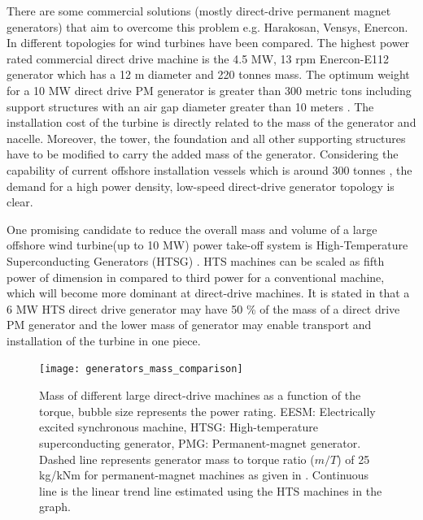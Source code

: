 \documentclass[final,peerreview,onecolumn]{IEEEtran}
\begin{document}
There are some commercial solutions (mostly direct-drive permanent magnet generators) that aim to overcome this problem e.g. Harakosan, Vensys, Enercon. In \cite{Bang2008} different topologies for wind turbines have been compared. The highest power rated  commercial direct drive machine is the 4.5 MW, 13 rpm Enercon-E112 generator which has a 12 m diameter and 220 tonnes mass. The optimum weight for a 10 MW direct drive PM generator is greater than 300 metric tons including support structures with an air gap diameter greater than 10 meters \cite{Bang2008}. The installation cost of the turbine is directly related to the mass of the generator and nacelle. Moreover, the tower, the foundation and all other supporting structures have to be modified to carry the added mass of the generator. Considering the capability of current offshore installation vessels which is around 300 tonnes \cite{Lewis2007}, the demand for a high power density, low-speed direct-drive generator topology is clear.

One promising candidate to reduce the overall mass and volume of a large offshore wind turbine(up to 10 MW) power take-off system is High-Temperature Superconducting Generators (HTSG) \cite{Lesser2009, Lewis2007, Kalsi2004}. HTS machines can be scaled as fifth power of dimension in \cite{Kalsi2004} compared to third power for a conventional machine, which will become more dominant at direct-drive machines. It is stated in \cite{Lewis2007} that a 6 MW HTS direct drive generator may have 50 \% of the mass of a direct drive PM generator and the lower mass of generator may enable transport and installation of the turbine in one piece.

\begin{figure}[!t]
\centering
\texttt{[image: generators\_mass\_comparison]}
\caption{Mass of different large direct-drive machines as a function of the torque, bubble size represents the power rating.
EESM: Electrically excited synchronous machine, HTSG: High-temperature superconducting generator, PMG: Permanent-magnet generator. Dashed line represents generator mass to torque ratio ($m/T$) of 25 kg/kNm for permanent-magnet machines as given in \cite{Bang2008}. Continuous line is the linear trend line estimated using the HTS machines in the graph.}
\label{generators_mass_comparison}
\end{figure}
\end{document}
